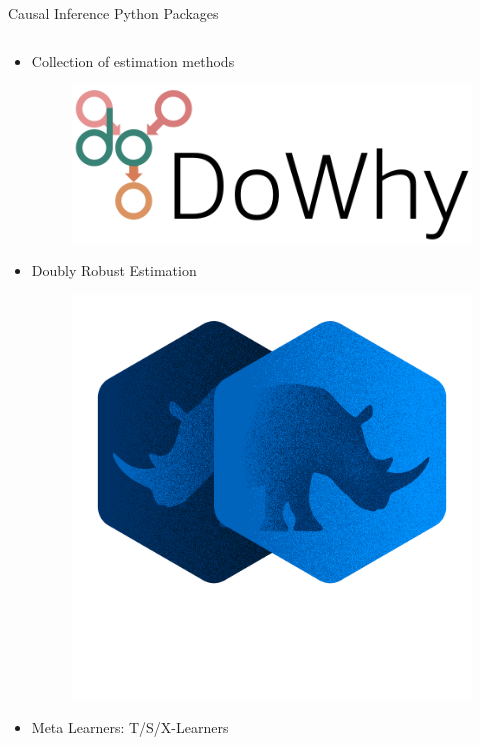 \documentclass[aspectratio=169]{beamer}
\begin{document}
\begin{frame}{Causal Inference Python Packages}
	\begin{columns}
		\begin{column}[T]{0.5 \textwidth}
			\begin{itemize}
				\item Collection of estimation methods
					\begin{figure}
						\includegraphics[scale=0.15]{imgs/dowhy.png}
					\end{figure}
				\item Doubly Robust Estimation
					\begin{figure}
						\includegraphics[scale=0.1]{imgs/doubleml.png}
					\end{figure}
				\item Meta Learners: T/S/X-Learners

\end{itemize}
\end{column}
\end{columns}
\end{frame}
\end{document}
